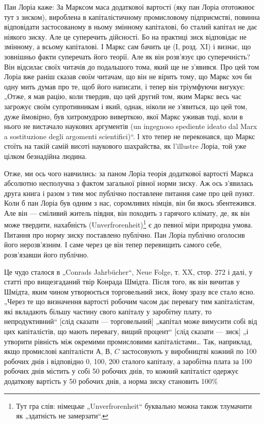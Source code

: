 Пан Лоріа каже: За Марксом маса додаткової вартості (яку
пан Лоріа ототожнює тут з зиском), вироблена в капіталістичному
промисловому підприємстві, повинна відповідати застосованому
в ньому змінному капіталові, бо сталий капітал не дає
ніякого зиску. Але це суперечить дійсності. Бо на практиці зиск
відповідає не змінному, а всьому капіталові. І Маркс сам бачить
це (І, розд. XI) і визнає, що зовнішньо факти суперечать
його теорії. Але як він розв’язує цю суперечність? Він відсилає
своїх читачів до подальшого тома, який ще не з’явився.
Про цей том Лоріа вже раніш сказав \emph{своїм} читачам, що він
не вірить тому, що Маркс хоч би одну мить думав про те,
щоб його написати, і тепер він тріумфуючи вигукує: „Отже,
я мав рацію, коли твердив, що цей другий том, яким Маркс
весь час загрожує своїм супротивникам і який, однак, ніколи
не з’явиться, що цей том, дуже ймовірно, був хитромудрою
виверткою, якої Маркс уживав тоді, коли в нього не
вистачало наукових аргументів (un ingegnoso spediente ideato
dal Marx a sostituzione degli argomenti scientifici)“. І хто тепер
не переконався, що Маркс стоїть на такій самій висоті наукового
шахрайства, як l'illustre Лоріа, той уже цілком безнадійна
людина.

\disablefootnotebreak{}
Отже, ми ось чого навчились: за паном Лоріа теорія додаткової
вартості Маркса абсолютно несполучна з фактом загальної
рівної норми зиску. Аж ось з’явилась друга книга і разом
з тим моє публічно поставлене питання саме про цей пункт.
Коли б пан Лоріа був одним з нас, соромливих німців, він би
якось збентежився. Але він — сміливий житель півдня, він походить
з гарячого клімату, де, як він може твердити, нахабність
(Unverfrorenheit)\footnote*{Тут гра слів: німецьке „Unverfrorenheit“ буквально можна також тлумачити
як „здатність не замерзати“. } є до певної міри природна умова. Питання
про норму зиску поставлено публічно. Пан Лоріа публічно оголосив
його нерозв’язним. І саме через це він тепер перевищить
самого себе, розв’язавши його публічно.
\enablefootnotebreak{}

Це чудо сталося в „Conrads Jahrbücher“, Neue Folge, т. XX,
стор. 272 і далі, у статті про вищезгаданий твір Конрада Шмідта.
Після того, як він вичитав у Шмідта, яким чином утворюється
торговельний зиск, йому зразу все стало ясно. „Через те що
визначення вартості робочим часом дає перевагу тим капіталістам,
які вкладають більшу частину свого капіталу у заробітну
плату, то непродуктивний“ [слід сказати — торговельний] „капітал
може вимусити собі від цих капіталістів, що мають перевагу,
вищий процент“ [слід сказати — зиск] „і утворити рівність
між окремими промисловими капіталістами\dots{} Так, наприклад,
якщо промислові капіталісти $А$, $В$, $C$ застосовують у виробництві
кожний по 100 робочих днів і відповідно 0, 100, 200
сталого капіталу, а заробітна плата за 100 робочих днів містить
у собі 50 робочих днів, то кожний капіталіст одержує додаткову
вартість у 50 робочих днів, а норма зиску становить 100\%
\parbreak{}  %

